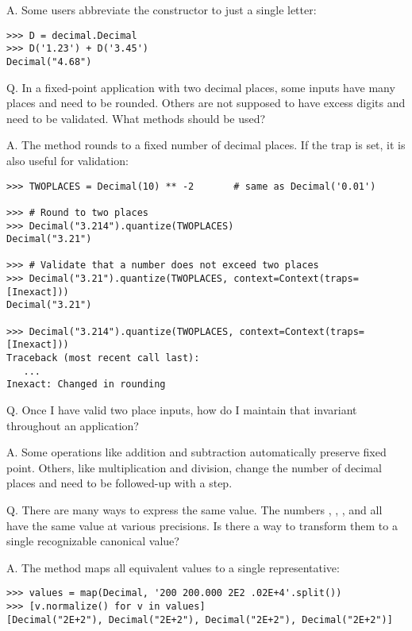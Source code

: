 A.  Some users abbreviate the constructor to just a single letter:

\begin{verbatim}
>>> D = decimal.Decimal
>>> D('1.23') + D('3.45')
Decimal("4.68")
\end{verbatim}


Q.  In a fixed-point application with two decimal places, some inputs
have many places and need to be rounded.  Others are not supposed to have
excess digits and need to be validated.  What methods should be used?

A.  The  method rounds to a fixed number of decimal places.
If the  trap is set, it is also useful for validation:

\begin{verbatim}
>>> TWOPLACES = Decimal(10) ** -2       # same as Decimal('0.01')

>>> # Round to two places
>>> Decimal("3.214").quantize(TWOPLACES)
Decimal("3.21")

>>> # Validate that a number does not exceed two places 
>>> Decimal("3.21").quantize(TWOPLACES, context=Context(traps=[Inexact]))
Decimal("3.21")

>>> Decimal("3.214").quantize(TWOPLACES, context=Context(traps=[Inexact]))
Traceback (most recent call last):
   ...
Inexact: Changed in rounding
\end{verbatim}


Q.  Once I have valid two place inputs, how do I maintain that invariant
throughout an application?

A.  Some operations like addition and subtraction automatically preserve fixed
point.  Others, like multiplication and division, change the number of decimal
places and need to be followed-up with a  step.


Q.  There are many ways to express the same value.  The numbers
, , , and  all
have the same value at various precisions. Is there a way to transform them to
a single recognizable canonical value?

A.  The  method maps all equivalent values to a single
representative:

\begin{verbatim}
>>> values = map(Decimal, '200 200.000 2E2 .02E+4'.split())
>>> [v.normalize() for v in values]
[Decimal("2E+2"), Decimal("2E+2"), Decimal("2E+2"), Decimal("2E+2")]
\end{verbatim}



